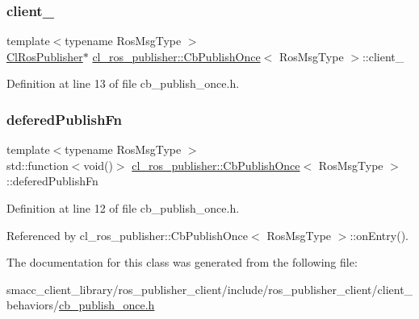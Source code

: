 \subsubsection{\texorpdfstring{client\+\_\+}{client\_}}
{\footnotesize\ttfamily template$<$typename Ros\+Msg\+Type $>$ \\
\hyperlink{classcl__ros__publisher_1_1ClRosPublisher}{Cl\+Ros\+Publisher}$\ast$ \hyperlink{classcl__ros__publisher_1_1CbPublishOnce}{cl\+\_\+ros\+\_\+publisher\+::\+Cb\+Publish\+Once}$<$ Ros\+Msg\+Type $>$\+::client\+\_\+\hspace{0.3cm}{\ttfamily [private]}}



Definition at line 13 of file cb\+\_\+publish\+\_\+once.\+h.

\mbox{\label{classcl__ros__publisher_1_1CbPublishOnce_a6222a91fb87cd3118ca9f84ff857c696}} 
\subsubsection{\texorpdfstring{defered\+Publish\+Fn}{deferedPublishFn}}
{\footnotesize\ttfamily template$<$typename Ros\+Msg\+Type $>$ \\
std\+::function$<$void()$>$ \hyperlink{classcl__ros__publisher_1_1CbPublishOnce}{cl\+\_\+ros\+\_\+publisher\+::\+Cb\+Publish\+Once}$<$ Ros\+Msg\+Type $>$\+::defered\+Publish\+Fn\hspace{0.3cm}{\ttfamily [private]}}



Definition at line 12 of file cb\+\_\+publish\+\_\+once.\+h.



Referenced by cl\+\_\+ros\+\_\+publisher\+::\+Cb\+Publish\+Once$<$ Ros\+Msg\+Type $>$\+::on\+Entry().



The documentation for this class was generated from the following file\+:\begin{DoxyCompactItemize}
\item 
smacc\+\_\+client\+\_\+library/ros\+\_\+publisher\+\_\+client/include/ros\+\_\+publisher\+\_\+client/client\+\_\+behaviors/\hyperlink{cb__publish__once_8h}{cb\+\_\+publish\+\_\+once.\+h}\end{DoxyCompactItemize}
